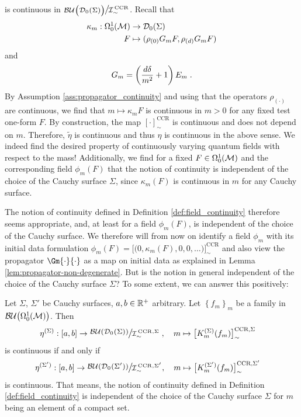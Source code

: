 is continuous in ${\Quotientscale{\BU\big(\Dzs\big)}{\ICCR}}$. Recall that
\begin{align}
\kappa_m : \Omega^1_0(\mathcal{M}) &\to \mathcal{D}_{0}(\Sigma) \\
F&\mapsto (\rho_{(0)} G_m F , \rho_{(d)} G_m F)  \notag
\end{align} and
\begin{align}
	G_m = \left( \frac{d \delta}{m^2} +1\right) E_m \;.
\end{align}
By Assumption \ref{ass:propagator_continuity} and using that the operators $\rho_{(\cdot)}$ are continuous, we find that $m \mapsto \kappa_m F$ is continuous in $m >0$ for any fixed test one-form $F$. By construction, the map $[\cdot]^\text{CCR}_\sim$ is continuous and does not depend on $m$. Therefore, $\widetilde{\eta}$ is continuous and thus $\eta$ is continuous in the above sense.
We indeed find the desired property of continuously varying quantum fields with respect to the mass! Additionally, we find for a fixed $F \in \Omega^1_0(\mathcal{M})$ and the corresponding field $\phi_m(F)$ that the notion of continuity is independent of the choice of the Cauchy surface $\Sigma$, since $\kappa_m(F)$ is continuous in $m$ for any Cauchy surface.\par
The notion of continuity defined in Definition \ref{def:field_continuity} therefore seems appropriate, and, at least for a field $\phi_m(F)$, is independent of the choice of the Cauchy surface. We therefore will from now on identify a field $\phi_m$ with its initial data formulation $\phi_m(F) = \big[\big (0, \kappa_m(F),0,0,\dots\big)\big]_\sim^\text{CCR}$ and also view the propagator $\Gm{\cdot}{\cdot}$ as a map on initial data as explained in Lemma \ref{lem:propagator-non-degenerate}. But is the notion in general independent of the choice of the Cauchy surface $\Sigma$? To some extent, we can answer this positively:
\begin{lemma}\label{lem:continuity-independence-source-free}
	Let $\Sigma$, $\Sigma'$ be Cauchy surfaces, $a,b \in \mathbb{R}^+$ arbitrary. Let $\left\{ f_m\right\}_m$ be a family in ${\mathcal{BU}\big(\Omega^1_0(\mathcal{M})\big)}$. Then
	\begin{align*}
		\eta^{(\Sigma)} : [ a , b] &\to {\Quotientscale{\BU(\Dzs  )}{\ICCRS}}\hspace{1mm}, \quad m \mapsto \big[ K_m^{(\Sigma)}(f_m) \big]_\sim^{\text{CCR},\Sigma}
	\end{align*}
		is continuous if and only if
		\begin{align*}
		\eta^{(\Sigma')} : [ a , b] &\to {\Quotientscale{\BU(\Dzsp)}{\ICCRSP}}, \quad m \mapsto \big[ K_m^{(\Sigma')}(f_m) \big]_\sim^{\text{CCR},\Sigma'}
	\end{align*}
	is continuous.
	That means, the notion of continuity defined in Definition \ref{def:field_continuity} is independent of the choice of the Cauchy surface $\Sigma$ for $m$ being an element of a compact set.
\end{lemma}
